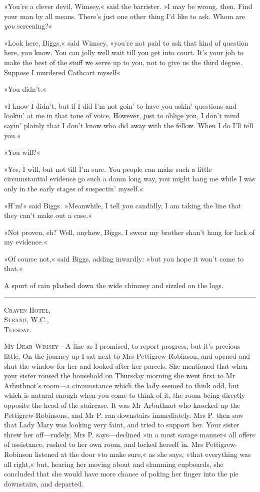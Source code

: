 »You're a clever devil, Wimsey,« said the barrister. »I may be wrong, then. Find your man by all means. There's just one other thing I'd like to ask. Whom are \textit{you} screening?«

»Look here, Biggs,« said Wimsey, »you're not paid to ask that kind of question here, you know. You can jolly well wait till you get into court. It's your job to make the best of the stuff we serve up to you, not to give us the third degree. Suppose I murdered Cathcart myself\longdash«

»You didn't.«

»I know I didn't, but if I did I'm not goin' to have you askin' questions and lookin' at me in that tone of voice. However, just to oblige you, I don't mind sayin' plainly that I don't know who did away with the fellow. When I do I'll tell you.«

»You will?«

»Yes, I will, but not till I'm sure. You people can make such a little circumstantial evidence go such a damn long way, you might hang me while I was only in the early stages of suspectin' myself.«

»H'm!« said Biggs. »Meanwhile, I tell you candidly, I am taking the line that they can't make out a case.«

»Not proven, eh? Well, anyhow, Biggs, I swear my brother shan't hang for lack of my evidence.«

»Of course not,« said Biggs, adding inwardly: »but you hope it won't come to that.«

A spurt of rain plashed down the wide chimney and sizzled on the logs.

\noindent\hfil\rule{0.5\textwidth}{.4pt}\hfil

\begin{flushright}
\textsc{Craven Hotel,}\\
\textsc{Strand, W.C.,}\\
\textsc{Tuesday.}
\end{flushright}


\textsc{My Dear Wimsey}—A line as I promised, to report progress, but it's precious little. On the journey up I sat next to Mrs  Pettigrew-Robinson, and opened and shut the window for her and looked after her parcels. She mentioned that when your sister roused the household on Thursday morning she went first to Mr Arbuthnot's room—a circumstance which the lady seemed to think odd, but which is natural enough when you come to think of it, the room being directly opposite the head of the staircase. It was Mr Arbuthnot who knocked up the Pettigrew-Robinsons, and Mr P. ran downstairs immediately.  Mrs P. then saw that Lady Mary was looking very faint, and tried to support her. Your sister threw her off—rudely, Mrs P. says—declined »in a most savage manner« all offers of assistance, rushed to her own room, and locked herself in. Mrs Pettigrew-Robinson listened at the door »to make sure,« as she says, »that everything was all right,« but, hearing her moving about and slamming cupboards, she concluded that she would have more chance of poking her finger into the pie downstairs, and departed.

